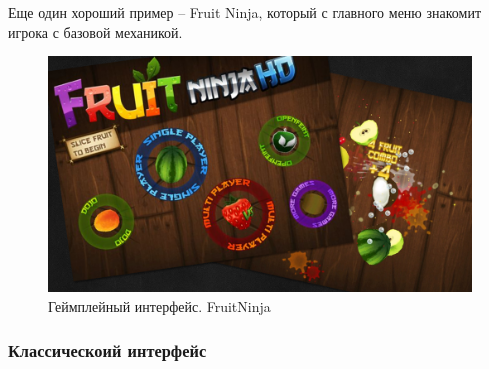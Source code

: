 \documentclass{article}
\begin{document}
Еще один хороший пример -- Fruit Ninja, который с главного меню знакомит игрока с базовой механикой.

\begin{figure}[H]
  \includegraphics[width=\textwidth]{res/img/fruitNinja.png}
  \caption{Геймплейный интерфейс. FruitNinja}
\end{figure}

\subsubsection*{Классическоий интерфейс}
\end{document}

